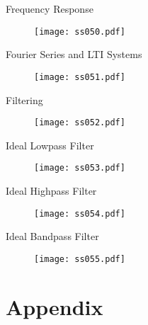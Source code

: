 \begin{frame}{Frequency Response}
\begin{figure}
\centering
\texttt{[image: ss050.pdf]}
\end{figure}
\end{frame}

\begin{frame}{Fourier Series and LTI Systems}
\begin{figure}
\centering
\texttt{[image: ss051.pdf]}
\end{figure}
\end{frame}

\begin{frame}{Filtering}
\begin{figure}
\centering
\texttt{[image: ss052.pdf]}
\end{figure}
\end{frame}

\begin{frame}{Ideal Lowpass Filter}
\begin{figure}
\centering
\texttt{[image: ss053.pdf]}
\end{figure}
\end{frame}

\begin{frame}{Ideal Highpass Filter}
\begin{figure}
\centering
\texttt{[image: ss054.pdf]}
\end{figure}
\end{frame}

\begin{frame}{Ideal Bandpass Filter}
\begin{figure}
\centering
\texttt{[image: ss055.pdf]}
\end{figure}
\end{frame}


\section{Appendix}

